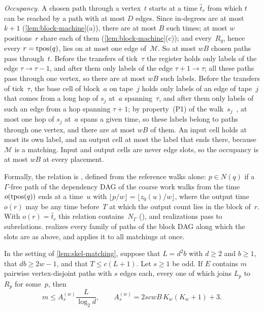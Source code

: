 \begin{outline}
\emph{Occupancy.} A chosen path through a vertex~$t$ starts at a time $\hat t_r$ from which $t$ can be reached by a path
with at most $D$ edges. Since in-degrees are at most $k+1$ (\cref{lem:block-machine}(a)), there are at most $B$ such
times; at most $w$ positions~$r$ share each of them (\cref{lem:block-machine}(c)); and every~$R_q$, hence every
$r=\operatorname{tpos}(q)$, lies on at most one edge of~$\mathcal M$. So at most $wB$ chosen paths pass through~$t$. Before the
transfers of tick~$\tau$ the register holds only labels of the edge $\tau\to\tau-1$, and after them only labels of the
edge $\tau+1\to\tau$; all these paths pass through one vertex, so there are at most $wB$ such labels. Before the
transfers of tick~$\tau$, the base cell of block~$a$ on tape~$j$ holds only labels of an edge of tape~$j$ that comes
from a long hop of $s_j$ at~$a$ spanning~$\tau$, and after them only labels of such an edge from a hop spanning
$\tau+1$; by property~(P1) of the walk~$s_j$~\cite[Section~2.2]{BoundedNesting2026}, at most one hop of $s_j$ at~$a$
spans a given time, so these labels belong to paths through one vertex, and there are at most $wB$ of them. An input
cell holds at most its own label, and an output cell at most the label that ends there, because $\mathcal M$ is a
matching. Input and output cells are never edge slots, so the occupancy is at most $wB$ at every placement.

Formally, the relation is , defined from the reference walks alone: $p\in N(q)$ if a
$\Gamma$-free path of the dependency DAG of the coarse work walks from the time $o(\operatorname{tpos}(q))$ ends at a time~$u$ with
$\lfloor p/w\rfloor=\lfloor z_0(u)/w\rfloor$, where the output time $o(r)$ may be any time before~$T$ at which the output
count lies in the block of~$r$. With $o(r)=\hat t_r$ this relation contains~$N_\Gamma$
(), and realizations pass to subrelations. 
realizes every family of paths of the block DAG along which the slots are as above, and 
applies it to all matchings at once.
\end{outline}

\begin{lemma}\label{lem:skel-disjoint}
In the setting of \cref{lem:skel-matching}, suppose that $L=d^2b$ with $d\ge2$ and $b\ge1$, that $db\ge2w-1$, and that
$T\le c(L+1)$. Let $s\ge1$ be odd. If $E$ contains $m$ pairwise vertex-disjoint paths with $s$ edges each, every one of
which joins $L_p$ to~$R_p$ for some~$p$, then
\[
  m\le A^{(w)}_s\frac L{\log_2d},\qquad A^{(w)}_s=2scwB\,K_w(K_w+1)+3 .
\]
\end{lemma}

